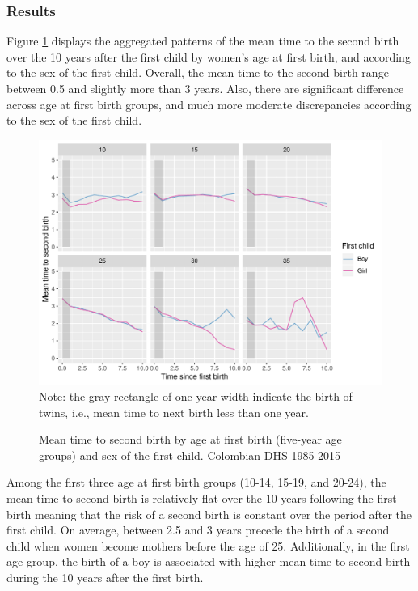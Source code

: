 \documentclass{article}
\begin{document}
\subsubsection{Results}
Figure \ref{fert_01} displays the aggregated patterns of the mean time to the second birth over the 10 years after the first child by women's age at first birth, and according to the sex of the first child. Overall, the mean time to the second birth range between 0.5 and slightly more than 3 years. Also, there are significant difference across age at first birth groups, and much more moderate discrepancies according to the sex of the first child.

\begin{figure}[H]
\centering
\caption{Mean time to second birth by age at first birth (five-year age groups) and sex of the first child. Colombian DHS 1985-2015}
    \includegraphics[scale=0.8]{Figures/mt_second_birth_by_sex_first.pdf}\\
    \label{fert_01}
    Note: the gray rectangle of one year width indicate the birth of twins, i.e., mean time to next birth less than one year.
\end{figure}

Among the first three age at first birth groups (10-14, 15-19, and 20-24), the mean time to second birth is relatively flat over the 10 years following the first birth meaning that the risk of a second birth is constant over the period after the first child. On average, between 2.5 and 3 years precede the birth of a second child when women become mothers before the age of 25. Additionally, in the first age group, the birth of a boy is associated with higher mean time to second birth during the 10 years after the first birth.
\end{document}
